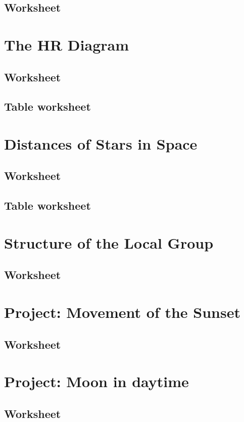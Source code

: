 \documentclass[12pt]{article}
\begin{document}
\subsection{Worksheet}\label{apx:lab_08_ws}


\newpage
\section{The HR Diagram}\label{apx:lab_09}
\subsection{Worksheet}\label{apx:lab_09_ws}

\newpage
\subsection{Table worksheet}\label{apx:lab_09_tb}


\newpage
\section{Distances of Stars in Space}\label{apx:lab_10}
\subsection{Worksheet}\label{apx:lab_10_ws}

\newpage
\subsection{Table worksheet}\label{apx:lab_10_tb}


\newpage
\section{Structure of the Local Group}\label{apx:lab_11}
\subsection{Worksheet}\label{apx:lab_11_ws}


\newpage
\section{Project: Movement of the Sunset}\label{apx:pro_1}
\subsection{Worksheet}\label{apx:pro_1_ws}


\newpage
\section{Project: Moon in daytime}\label{apx:pro_2}
\subsection{Worksheet}\label{apx:pro_2_ws}

\end{document}

